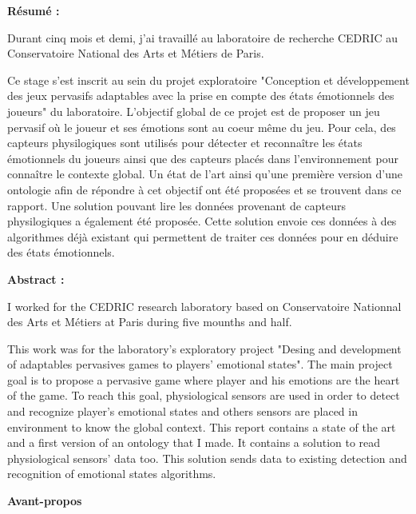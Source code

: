 \documentclass{article}
\begin{document}
\newpage
\begin{center}
	\textbf{Résumé :}
\end{center}
\hspace*{0.4cm}
Durant cinq mois et demi, j'ai travaillé au laboratoire de recherche CEDRIC au Conservatoire National des Arts et Métiers de Paris.\par
Ce stage s'est inscrit au sein du projet exploratoire "Conception et développement des jeux pervasifs adaptables avec la prise en compte des états émotionnels des joueurs" du laboratoire.
L'objectif global de ce projet est de proposer un jeu pervasif où le joueur et ses émotions sont au coeur même du jeu. 
Pour cela, des capteurs physilogiques sont utilisés pour détecter et reconnaître les états émotionnels du joueurs ainsi que des capteurs placés dans l'environnement pour connaître le contexte global. 
Un état de l'art ainsi qu'une première version d'une ontologie afin de répondre à cet objectif ont été proposées et se trouvent dans ce rapport. 
Une solution pouvant lire les données provenant de capteurs physilogiques a également été proposée.
Cette solution envoie ces données à des algorithmes déjà existant qui permettent de traiter ces données pour en déduire des états émotionnels.
\bigskip\newline
\begin{center}
	\textbf{Abstract :}
\end{center}
\hspace*{0.4cm}
I worked for the CEDRIC research laboratory based on Conservatoire Nationnal des Arts et Métiers at Paris during five mounths and half.\par
This work was for the laboratory's exploratory project "Desing and development of adaptables pervasives games to players' emotional states".
The main project goal is to propose a pervasive game where player and his emotions are the heart of the game.
To reach this goal, physiological sensors are used in order to detect and recognize player's emotional states and others sensors are placed in environment to know the global context.
This report contains a state of the art and a first version of an ontology that I made. 
It contains a solution to read physiological sensors' data too.
This solution sends data to existing detection and recognition of emotional states algorithms.
\vspace*{4cm}
\begin{center}
	\textbf{Avant-propos}
\end{center}
\hspace*{0.4cm}
\end{document}
